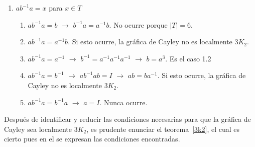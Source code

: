 \documentclass[12pt]{book}
\theoremstyle{definition}
\begin{document}
\begin{enumerate}
\item $ab^{-1}a=x$ para $x\in T$
  \begin{enumerate}
  \item $ab^{-1}a=b$ $\rightarrow$ $b^{-1}a=a^{-1}b$. No ocurre porque
    $|T|=6$.
  \item $ab^{-1}a=a^{-1}b$. Si esto ocurre, la gráfica de Cayley no es
    localmente $3K_2$.
  \item $ab^{-1}a=a^{-1}$ $\rightarrow$ $b^{-1}=a^{-1}a^{-1}a^{-1}$
    $\rightarrow$ $b=a^3$. Es el caso 1.2
  \item $ab^{-1}a=b^{-1}$ $\rightarrow$ $ab^{-1}ab=I$ $\rightarrow$
    $ab=ba^{-1}$. Si esto ocurre, la gráfica de Cayley no es
    localmente $3K_2$.
  \item $ab^{-1}a=b^{-1}a$ $\rightarrow$ $a=I$. Nunca ocurre.

  \end{enumerate}
\end{enumerate}



Después de identificar y reducir las condiciones necesarias para que
la gráfica de Cayley sea localmente $3K_2$, es prudente enunciar el
teorema~\ref{3k2}, el cual es cierto pues en el se expresan las
condiciones encontradas.
 
\end{document}

